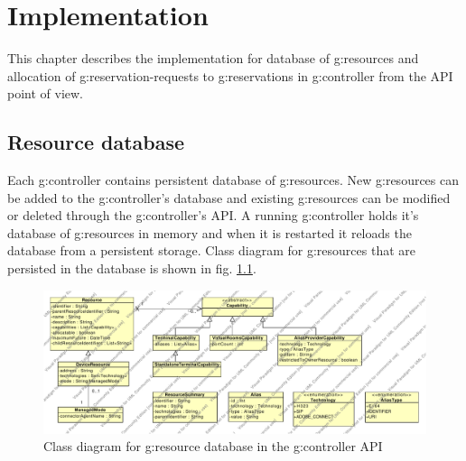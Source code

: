 \chapter{Implementation}



This chapter describes the implementation for database of \glspl{g:resource} and allocation of \glspl{g:reservation-request} to \glspl{g:reservation} in \gls{g:controller} from the API point of view.

\section{Resource database}

Each \gls{g:controller} contains persistent database of \glspl{g:resource}. New \glspl{g:resource} can be added to the \gls{g:controller}'s database and existing \glspl{g:resource} can be modified or deleted through the \gls{g:controller}'s API. A running \gls{g:controller} holds it's database of \glspl{g:resource} in memory and when it is restarted it reloads the database from a persistent storage. Class diagram for \glspl{g:resource} that are persisted in the database is shown in fig. \ref{fig:cd_api_resources}.

\begin{figure}[ht!]
\includegraphics[width=\textwidth]{diagrams/cd_api_resources}
\caption{Class diagram for \gls{g:resource} database in the \gls{g:controller} API}
\label{fig:cd_api_resources}
\end{figure}

